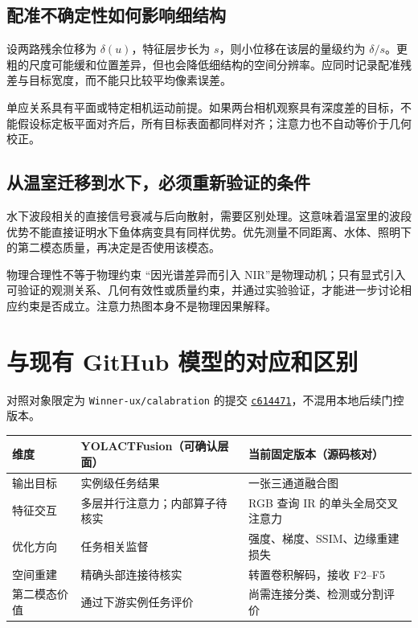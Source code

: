\documentclass[UTF8,a4paper,11pt,fontset=windows]{ctexart}
\newcommand{\newpagepart}{\clearpage}
\begin{document}
\subsection{配准不确定性如何影响细结构}
设两路残余位移为 $\delta(u)$，特征层步长为 $s$，则小位移在该层的量级约为 $\delta/s$。更粗的尺度可能缓和位置差异，但也会降低细结构的空间分辨率。应同时记录配准残差与目标宽度，而不能只比较平均像素误差。

单应关系具有平面或特定相机运动前提\cite{opencv}。如果两台相机观察具有深度差的目标，不能假设标定板平面对齐后，所有目标表面都同样对齐；注意力也不自动等价于几何校正。

\subsection{从温室迁移到水下，必须重新验证的条件}
水下波段相关的直接信号衰减与后向散射，需要区别处理\cite{akkaynak2018}。这意味着温室里的波段优势不能直接证明水下鱼体病变具有同样优势。优先测量不同距离、水体、照明下的第二模态质量，再决定是否使用该模态。
\begin{boundary}{物理合理性不等于物理约束}
“因光谱差异而引入 NIR”是物理动机；只有显式引入可验证的观测关系、几何有效性或质量约束，并通过实验验证，才能进一步讨论相应约束是否成立。注意力热图本身不是物理因果解释。
\end{boundary}

\newpagepart
\section{与现有 GitHub 模型的对应和区别}
\noindent 对照对象限定为 \texttt{Winner-ux/calabration} 的提交
\href{https://github.com/Winner-ux/calabration/tree/c61447127faea3625eec9a17ff841c7b249a8d59}{\texttt{c614471}}，不混用本地后续门控版本\cite{repo}。

\noindent\begin{tabularx}{\linewidth}{@{}L{2.1cm}YY@{}}
\toprule
维度 & YOLACTFusion（可确认层面） & 当前固定版本（源码核对）\\
\midrule
输出目标 & 实例级任务结果 & 一张三通道融合图\\
特征交互 & 多层并行注意力；内部算子待核实 & RGB 查询 IR 的单头全局交叉注意力\\
优化方向 & 任务相关监督 & 强度、梯度、SSIM、边缘重建损失\\
空间重建 & 精确头部连接待核实 & 转置卷积解码，接收 F2--F5\\
第二模态价值 & 通过下游实例任务评价 & 尚需连接分类、检测或分割评价\\
\bottomrule
\end{tabularx}
\end{document}
